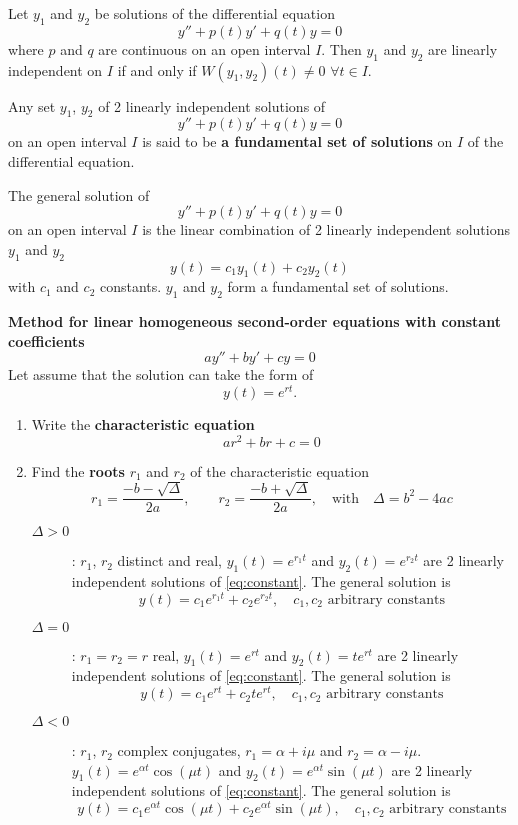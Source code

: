 \begin{theorem}
Let $y_1$ and $y_2$ be solutions of the differential equation
$$
y''+p(t)y'+q(t)y=0$$ where $p$ and $q$ are continuous on an open
interval $I$. Then $y_1$ and $y_2$ are linearly independent on $I$
if and only if $W(y_1,y_2)(t)\not=0$ $\forall t \in I$.
\end{theorem}

\begin{definition}
Any set $y_1$, $y_2$ of 2 linearly independent solutions of
$$
y''+p(t)y'+q(t)y=0$$ on an open interval $I$ is said to be {\bf a
fundamental set of solutions} on $I$ of the differential equation.
\end{definition} 


\begin{definition}
The general solution of
$$y''+p(t)y'+q(t)y=0$$ on an open interval $I$ is the linear combination of 2 linearly independent solutions $y_1$ and $y_2$
$$y(t)=c_1 y_1(t)+c_2y_2(t)$$
with $c_1$ and $c_2$ constants. $y_1$ and $y_2$ form a fundamental set of solutions.
\end{definition}


{\bf Method for linear homogeneous
second-order equations with constant coefficients}
\begin{equation}
ay''+by'+cy=0\label{eq:constant}
\end{equation}
Let assume that the solution can take the form of $$y(t)=e^{rt}.$$
\vspace{-.2cm}
 \begin{enumerate}
\item Write the {\bf characteristic equation }
$$ar^2+br+c=0$$
\item Find the {\bf roots} $r_1$ and $r_2$ of the characteristic equation
$$r_1=\frac{-b-\sqrt{\Delta}}{2a} , \qquad r_2=\frac{-b+\sqrt{\Delta}}{2a}, \quad \textrm{with} \quad \Delta=b^2-4ac $$
\begin{description}
\item[$\Delta >0$]: $r_1$, $r_2$ distinct and real,
$y_1(t)=e^{r_1t}$ and $y_2(t)=e^{r_2t}$ are 2 linearly independent
solutions of \eqref{eq:constant}. The general solution is
$$y(t)=c_1 e^{r_1t}+c_2e^{r_2t}, \quad c_1, c_2\textrm{ arbitrary constants}$$
\item[$\Delta =0$]: $r_1=r_2=r$ real, $y_1(t)=e^{rt}$ and $y_2(t)=te^{rt}$ are 2 linearly independent
solutions of \eqref{eq:constant}. The general solution is
$$y(t)=c_1 e^{rt}+c_2te^{rt} , \quad c_1, c_2\textrm{ arbitrary constants}$$
\item[$\Delta <0$]: $r_1$, $r_2$ complex conjugates, $r_1=\alpha + i \mu$ and $r_2=\alpha - i
\mu$. $y_1(t)=e^{\alpha t}\cos (\mu t)$ and $y_2(t)=e^{\alpha t}\sin
(\mu t)$ are 2 linearly independent solutions of
\eqref{eq:constant}. The general solution is
$$y(t)=c_1 e^{\alpha t}\cos (\mu t)+c_2e^{\alpha t}\sin (\mu t) , \quad c_1, c_2\textrm{ arbitrary constants}$$
\end{description}
\end{enumerate}

